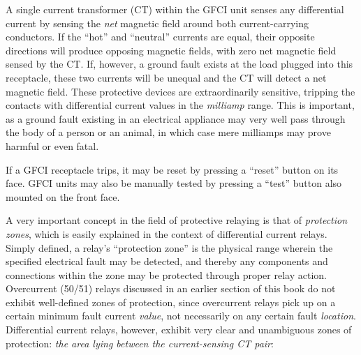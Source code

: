 A single current transformer (CT) within the GFCI unit senses any differential current by sensing the \textit{net} magnetic field around both current-carrying conductors.  If the ``hot'' and ``neutral'' currents are equal, their opposite directions will produce opposing magnetic fields, with zero net magnetic field sensed by the CT.  If, however, a ground fault exists at the load plugged into this receptacle, these two currents will be unequal and the CT will detect a net magnetic field.  These protective devices are extraordinarily sensitive, tripping the contacts with differential current values in the \textit{milliamp} range.  This is important, as a ground fault existing in an electrical appliance may very well pass through the body of a person or an animal, in which case mere milliamps may prove harmful or even fatal.

If a GFCI receptacle trips, it may be reset by pressing a ``reset'' button on its face.  GFCI units may also be manually tested by pressing a ``test'' button also mounted on the front face.










\vskip 10pt

\filbreak

A very important concept in the field of protective relaying is that of \textit{protection zones}, which is easily explained in the context of differential current relays.  Simply defined, a relay's ``protection zone'' is the physical range wherein the specified electrical fault may be detected, and thereby any components and connections within the zone may be protected through proper relay action.  Overcurrent (50/51) relays discussed in an earlier section of this book do not exhibit well-defined zones of protection, since overcurrent relays pick up on a certain minimum fault current \textit{value}, not necessarily on any certain fault \textit{location}.  Differential current relays, however, exhibit very clear and unambiguous zones of protection: \textit{the area lying between the current-sensing CT pair}:    

